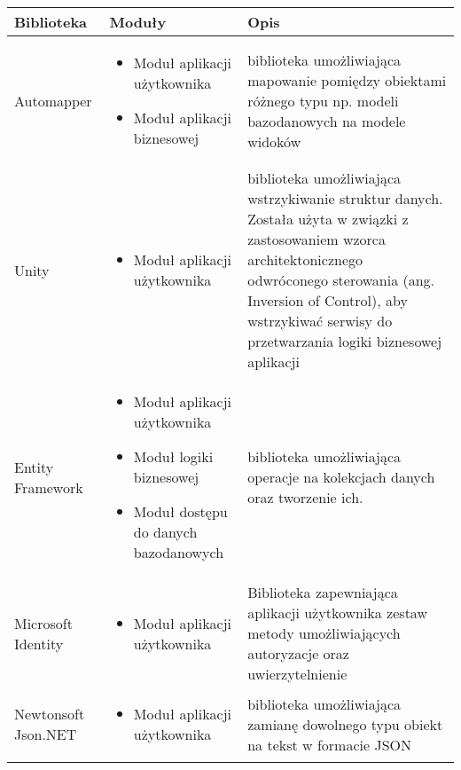 \begin{center}
    \begin{tabular}{ | l | p{6.5cm} | p{5cm} |}
    \hline Biblioteka & Moduły & Opis \\ \hline    
    \hline Automapper &  
    	\begin{itemize} 
   			 \item Moduł aplikacji użytkownika 
   			 \item Moduł aplikacji biznesowej	
   		\end{itemize} 
    & biblioteka umożliwiająca mapowanie pomiędzy obiektami różnego typu  np. modeli bazodanowych na modele widoków  		\\ \hline
    
    \hline Unity &	
    \begin{itemize} 
   			 \item Moduł aplikacji użytkownika 
    \end{itemize}
   			 & biblioteka umożliwiająca wstrzykiwanie struktur danych. Została użyta w związki z zastosowaniem wzorca architektonicznego odwróconego sterowania (ang. Inversion of Control), aby wstrzykiwać serwisy do przetwarzania logiki biznesowej aplikacji  		\\ \hline
    
        \hline Entity Framework &  
    	\begin{itemize} 
   			  \item Moduł aplikacji użytkownika 
 			  \item Moduł logiki biznesowej
			  \item Moduł dostępu do danych bazodanowych
   		\end{itemize} 
    &  biblioteka umożliwiająca operacje na kolekcjach danych oraz tworzenie ich.\\ \hline
    
        \hline Microsoft Identity & 
         \begin{itemize} 
   			 \item Moduł aplikacji użytkownika 
    	\end{itemize} & Biblioteka zapewniająca aplikacji użytkownika zestaw metody umożliwiających autoryzacje oraz uwierzytelnienie \\ \hline
    
        \hline Newtonsoft Json.NET  &
        \begin{itemize} 
   			 \item Moduł aplikacji użytkownika 
   		 \end{itemize}
    & biblioteka umożliwiająca zamianę dowolnego typu obiekt na tekst w formacie JSON		\\ \hline
    

\end{tabular}
\end{center}
